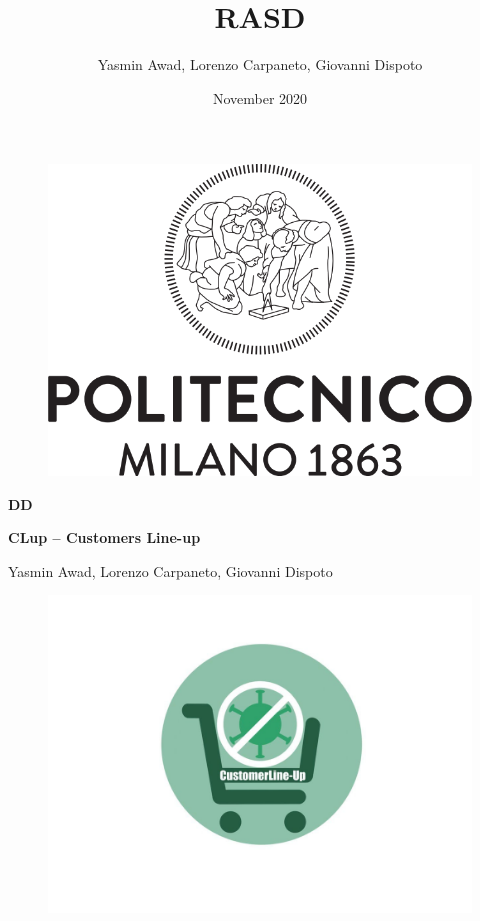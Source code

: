 \documentclass[a4paper, 12pt, oneside, table]{article}
\title{RASD}
\author{Yasmin Awad, Lorenzo Carpaneto, Giovanni Dispoto}
\date{November 2020}
\begin{document}
\begin{titlepage}
\begin{figure}[h!]
	\centering
	\includegraphics[scale=0.5]{img/logopoli.png}
\end{figure}
\vspace{0.7em}
\begin{center}
	\Large \textbf{DD}
\end{center}
\begin{center}
	\Large \textbf{CLup – Customers Line-up } 
\end{center}
\vspace{-0.6em}
\begin{center}
	\normalsize Yasmin Awad, Lorenzo Carpaneto, Giovanni Dispoto
	\begin{figure}[h!]
	\centering
	\includegraphics[scale=0.25]{img/logo.jpg}
\end{figure}
\end{center}
\vspace*{\fill}
\end{titlepage}
\end{document}
